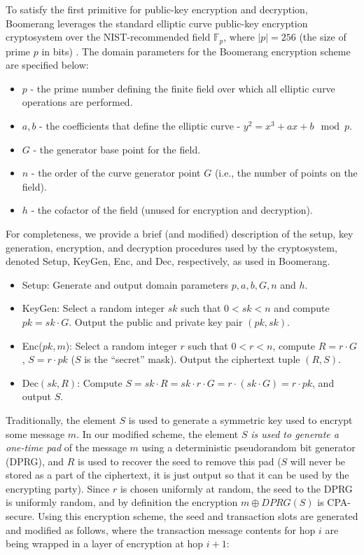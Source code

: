 To satisfy the first primitive for public-key encryption and decryption, Boomerang leverages the standard elliptic curve public-key  encryption cryptosystem over the NIST-recommended field $\mathbb{F}_{p}$, where $|p| = 256$ (the size of prime $p$ in bits) \cite{nist-curves}. The domain parameters for the Boomerang encryption scheme are specified below:
\begin{itemize}
	\item $p$ - the prime number defining the finite field over which all elliptic curve operations are performed.
	\item $a, b$ - the coefficients that define the elliptic curve - $y^2 = x^3 +ax + b \mod p$.
	\item $G$ - the generator base point for the field.
	\item $n$ - the order of the curve generator point $G$ (i.e., the number of points on the field).
	\item $h$ - the cofactor of the field (unused for encryption and decryption).
\end{itemize}
For completeness, we provide a brief (and modified) description of the setup, key generation, encryption, and decryption procedures used by the cryptosystem, denoted {\sf Setup}, {\sf KeyGen}, {\sf Enc}, and {\sf Dec}, respectively, as used in Boomerang. 
\begin{itemize}
	\item {\sf Setup}: Generate and output domain parameters $p,a,b,G,n$ and $h$. 
	\item {\sf KeyGen}: Select a random integer $sk$ such that $0 < sk < n$ and compute $pk = sk \cdot G$. Output the public and private key pair $(pk, sk)$.
	\item {\sf Enc}($pk, m$): Select a random integer $r$ such that $0 < r < n$, compute $R = r \cdot G$, $S = r \cdot pk$ ($S$ is the ``secret'' mask). Output the ciphertext tuple $(R, S)$.
	\item {\sf Dec}$(sk, R)$: Compute $S = sk \cdot R = sk \cdot r \cdot G = r \cdot (sk \cdot G) = r \cdot pk$, and output $S$.
\end{itemize}
Traditionally, the element $S$ is used to generate a symmetric key used to encrypt some message $m$. In our modified scheme, the element $S$ \emph{is used to generate a one-time pad} of the message $m$ using a deterministic pseudorandom bit generator (DPRG), and $R$ is used to recover the seed to remove this pad ($S$ will never be stored as a part of the ciphertext, it is just output so that it can be used by the encrypting party). Since $r$ is chosen uniformly at random, the seed to the DPRG is uniformly random, and by definition the encryption $m \oplus DPRG(S)$ is CPA-secure. Using this encryption scheme, the seed and transaction slots are generated and modified as follows, where the transaction message contents for hop $i$ are being wrapped in a layer of encryption at hop $i+1$:

